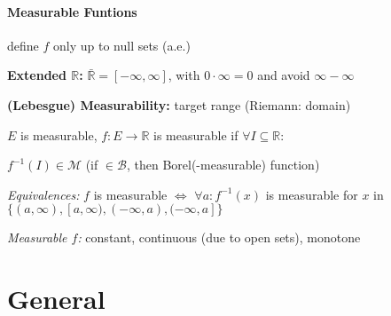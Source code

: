 \documentclass[8pt,twoside]{extarticle}
\begin{document}
\begin{multicols}{2}
\paragraph{Measurable Funtions} define $f$ only up to null sets (a.e.)

\textbf{Extended $\mathbb{R}$:} $\bar{\mathbb{R}} = [-\infty, \infty]$, with $0\cdot\infty=0$ and avoid $\infty{-}\infty$

\textbf{(Lebesgue) Measurability:} target range (Riemann: domain)

$E$ is measurable, $f:E\to\mathbb{R}$ is measurable if $\forall I \subseteq \mathbb{R}:$

$f^{-1}(I)\in \mathcal{M}$ (if $\in \mathcal{B}$, then Borel(-measurable) function)

\textit{Equivalences:} $f$ is measurable $\Leftrightarrow$ $\forall a: f^{-1}(x)$ is measurable \newline for $x$ in $\{(a,\infty),[a,\infty), (-\infty,a), (-\infty,a]\}$

\textit{Measurable $f$:} constant, continuous (due to open sets), monotone


\end{multicols}













\section{General}
\end{document}

